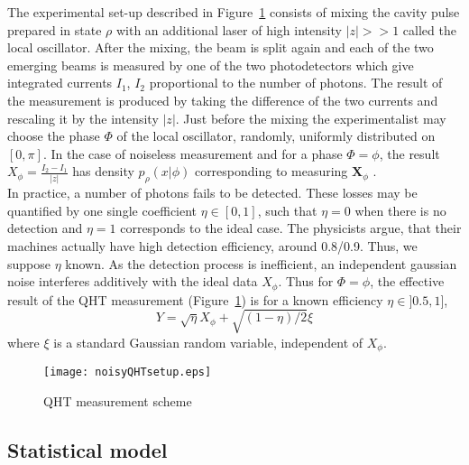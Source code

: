 \documentclass[a4paper]{amsart}
\begin{document}
The experimental set-up described in Figure~\ref{Pfig:1} consists of mixing the
cavity pulse prepared in state $\rho$ with an additional laser of high intensity
$\left|z\right|>>1$ called the local oscillator.
 After the mixing, the beam is split again and each of the two emerging beams is
measured by  one of the two photodetectors which give integrated currents $I_1$,
$I_2$ proportional to the number of photons. The result of the measurement is
produced by taking the difference of the two currents and rescaling it by the
intensity $|z|$.  Just before the mixing the experimentalist may choose the
phase $\Phi$ of the local oscillator, randomly, uniformly distributed on
$[0,\pi]$.  In the case of noiseless measurement and for a phase $\Phi=\phi$,
the result $X_\phi=\frac{I_2-I_1}{|z|}$ has density $p_\rho(x|\phi)$
corresponding to measuring $\mathbf{X}_\phi$ . \\


In practice, a number of photons fails to be detected. These losses may be
quantified by one single coefficient $\eta\in[0,1]$, such that  $\eta=0$ when
there is no detection and  $\eta=1$  corresponds to the ideal case. The
physicists argue, that their machines actually have high detection efficiency,
around 0.8/0.9. Thus, we suppose $\eta$ known. As the detection process is
inefficient, an independent gaussian noise interferes additively with the ideal
data $X_\phi$. Thus for $\Phi=\phi$, the effective result of the QHT measurement
(Figure~\ref{Pfig:1}) is   for a known efficiency $\eta\in]0.5,1]$,  
$$
Y=\sqrt{\eta}X_\phi+\sqrt{(1-\eta)/2}\xi
$$
where $\xi$ is a standard Gaussian random variable, independent of $X_\phi$.
%
\begin{figure}[!h]
\begin{center}
\texttt{[image: noisyQHTsetup.eps]}
\caption{QHT measurement scheme}
\label{Pfig:1}
\end{center}
\end{figure}







\subsection{Statistical model}
\label{Statistical.model}
\noindent\\
\end{document}
